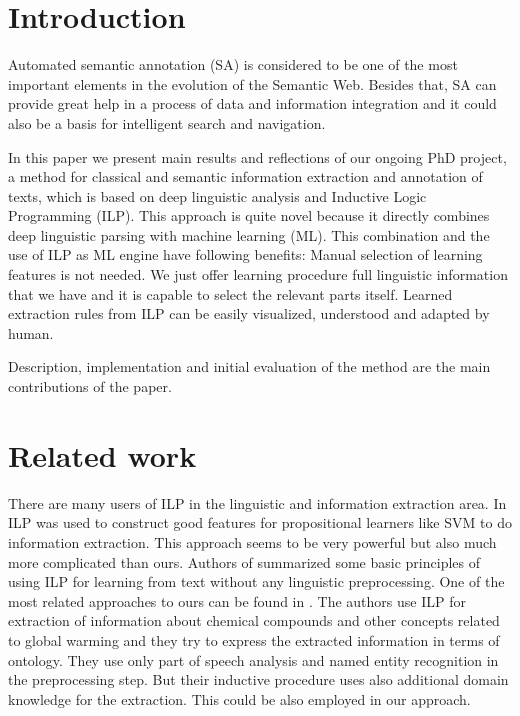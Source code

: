 \documentclass[runningheads,a4paper]{llncs}
\begin{document}
\section{Introduction}
Automated semantic annotation (SA) is considered to be one of the most important elements in the evolution of the Semantic Web. Besides that, SA can provide great help in a process of data and information integration and it could also be a basis for intelligent search and navigation.

In this paper we present main results and reflections of our ongoing PhD project, a method for classical and semantic information extraction and annotation of texts, which is based on deep linguistic analysis and Inductive Logic Programming (ILP). This approach is quite novel because it directly combines deep linguistic parsing with machine learning (ML). This combination and the use of ILP as ML engine have following benefits: Manual selection of learning features is not needed. We just offer learning procedure full linguistic information that we have and it is capable to select the relevant parts itself. Learned extraction rules from ILP can be easily visualized, understood and adapted by human.

Description, implementation and initial evaluation of the method are the main contributions of the paper.




\section{Related work}
There are many users of ILP in the linguistic and information extraction area.
In \cite{Ramakrishnan:UsingILPforFeatures} ILP was used to construct good features for propositional learners like SVM to do information extraction. This approach seems to be very powerful but also much more complicated than ours. Authors of \cite{Junker99learningfor} summarized some basic principles of using ILP for learning from text without any linguistic preprocessing. One of the most related approaches to ours can be found in \cite{aitken02:_learn_infor_extrac_rules}. The authors use ILP for extraction of information about chemical compounds and other concepts related to global warming and they try to express the extracted information in terms of ontology. They use only part of speech analysis and named entity recognition in the preprocessing step. But their inductive procedure uses also additional domain knowledge for the extraction. This could be also employed in our approach.
\end{document}
